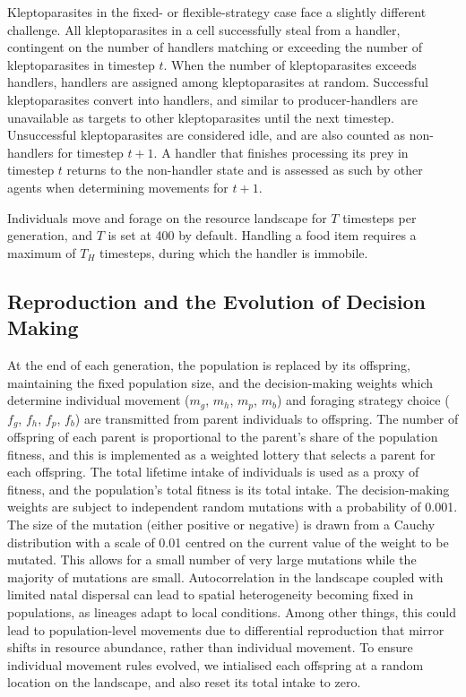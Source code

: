 \documentclass[11pt]{article}
\begin{document}
Kleptoparasites in the fixed- or flexible-strategy case face a slightly different challenge.
All kleptoparasites in a cell successfully steal from a handler, contingent on the number of handlers matching or exceeding the number of kleptoparasites in timestep $t$.
When the number of kleptoparasites exceeds handlers, handlers are assigned among kleptoparasites at random.
Successful kleptoparasites convert into handlers, and similar to producer-handlers are unavailable as targets to other kleptoparasites until the next timestep.
Unsuccessful kleptoparasites are considered idle, and are also counted as non-handlers for timestep $t+1$.
A handler that finishes processing its prey in timestep $t$ returns to the non-handler state and is assessed as such by other agents when determining movements for $t+1$.

Individuals move and forage on the resource landscape for $T$ timesteps per generation, and $T$ is set at 400 by default.
Handling a food item requires a maximum of $T_H$ timesteps, during which the handler is immobile.

\subsection*{Reproduction and the Evolution of Decision Making}

At the end of each generation, the population is replaced by its offspring, maintaining the fixed population size, and the decision-making weights which determine individual movement ($m_g$, $m_h$, $m_p$, $m_b$) and foraging strategy choice ($f_g$, $f_h$, $f_p$, $f_b$) are transmitted from parent individuals to offspring.
The number of offspring of each parent is proportional to the parent's share of the population fitness, and this is implemented as a weighted lottery that selects a parent for each offspring.
The total lifetime intake of individuals is used as a proxy of fitness, and the population's total fitness is its total intake.
The decision-making weights are subject to independent random mutations with a probability of 0.001.
The size of the mutation (either positive or negative) is drawn from a Cauchy distribution with a scale of 0.01 centred on the current value of the weight to be mutated.
This allows for a small number of very large mutations while the majority of mutations are small.
Autocorrelation in the landscape coupled with limited natal dispersal can lead to spatial heterogeneity becoming fixed in populations, as lineages adapt to local conditions.
Among other things, this could lead to population-level movements due to differential reproduction that mirror shifts in resource abundance, rather than individual movement.
To ensure individual movement rules evolved, we intialised each offspring at a random location on the landscape, and also reset its total intake to zero.
\end{document}
